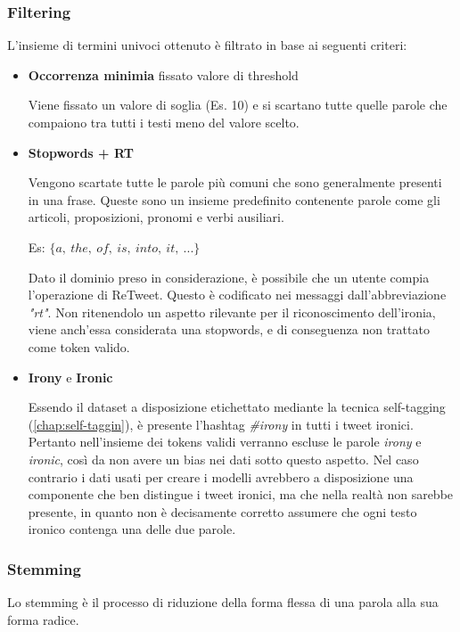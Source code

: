 \documentclass[oneside]{book}
\begin{document}
\subsubsection{Filtering}
L'insieme di termini univoci ottenuto è filtrato in base ai seguenti criteri:
\begin{itemize}
	\item \textbf{Occorrenza minimia} fissato valore di threshold
		
		Viene fissato un valore di soglia (Es. 10) e si scartano tutte quelle parole che compaiono tra tutti i testi meno del valore scelto. 
	\item \textbf{Stopwords + RT}
	
		Vengono scartate tutte le parole più comuni che sono generalmente presenti in una frase. Queste sono un insieme predefinito contenente parole come gli articoli, proposizioni, pronomi e verbi ausiliari.
		
		Es: $\{a,\ the,\ of,\ is,\ into,\ it,\ ...\}$
		
		Dato il dominio preso in considerazione, è possibile che un utente compia l'operazione di ReTweet. Questo è codificato nei messaggi dall'abbreviazione \emph{"rt"}. Non ritenendolo un aspetto rilevante per il riconoscimento dell'ironia, viene anch'essa considerata una stopwords, e di conseguenza non trattato come token valido.
	
		
	\item \textbf{Irony} e \textbf{Ironic}
	
	Essendo il dataset a disposizione etichettato mediante la tecnica self-tagging (\autoref{chap:self-taggin}), è presente l'hashtag \emph{\#irony} in tutti i tweet ironici. Pertanto nell'insieme dei tokens validi verranno escluse le parole \emph{irony} e \emph{ironic}, così da non avere un bias nei dati sotto questo aspetto. Nel caso contrario i dati usati per creare i modelli avrebbero a disposizione una componente che ben distingue i tweet ironici, ma che nella realtà non sarebbe presente, in quanto non è decisamente corretto assumere che ogni testo ironico contenga una delle due parole.
	
	
\end{itemize}

\subsubsection{Stemming}
Lo stemming è il processo di riduzione della forma flessa di una parola alla sua forma radice.
\end{document}
